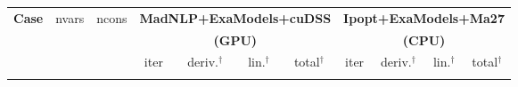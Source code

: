 \documentclass{standalone}
\begin{document}
\centering
\begin{tabular}{|l|c|c|cccc|cccc|}
  \hline
  \multirow{3}{*}{\textbf{Case}}
  & \multirow{3}{*}{nvars}
  & \multirow{3}{*}{ncons}
  & \multicolumn{4}{c|}{\textbf{MadNLP+ExaModels+cuDSS}}
  & \multicolumn{4}{c|}{\textbf{Ipopt+ExaModels+Ma27}}\\
  & & &\multicolumn{4}{c|}{\textbf{(GPU)}} &\multicolumn{4}{c|}{\textbf{(CPU)}}
  \\
  \cline{4-11}
  & & 
  & iter & deriv.$^\dag$ & lin.$^\dag$ & total$^\dag$
  & iter & deriv.$^\dag$ & lin.$^\dag$ & total$^\dag$
  \\
  \\
  \hline
\end{tabular}
\end{document}

